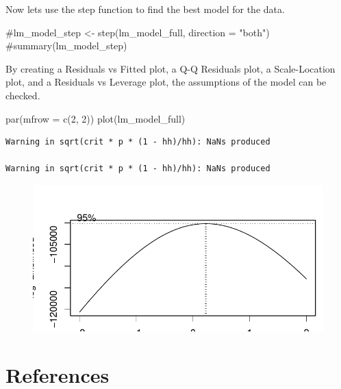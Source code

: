 \documentclass[
  super,
  preprint,
  3p]{elsarticle}
\newenvironment{Shaded}{\begin{snugshade}}{\end{snugshade}}
\newcommand{\AttributeTok}[1]{\textcolor[rgb]{0.40,0.45,0.13}{#1}}
\newcommand{\CommentTok}[1]{\textcolor[rgb]{0.37,0.37,0.37}{#1}}
\newcommand{\DecValTok}[1]{\textcolor[rgb]{0.68,0.00,0.00}{#1}}
\newcommand{\FunctionTok}[1]{\textcolor[rgb]{0.28,0.35,0.67}{#1}}
\newcommand{\NormalTok}[1]{\textcolor[rgb]{0.00,0.23,0.31}{#1}}
\begin{document}
Now lets use the step function to find the best model for the data.

\begin{Shaded}
\begin{Highlighting}[]
\CommentTok{\#lm\_model\_step \textless{}{-} step(lm\_model\_full, direction = "both")}
\CommentTok{\#summary(lm\_model\_step)}
\end{Highlighting}
\end{Shaded}

By creating a Residuals vs Fitted plot, a Q-Q Residuals plot, a
Scale-Location plot, and a Residuals vs Leverage plot, the assumptions
of the model can be checked.

\begin{Shaded}
\begin{Highlighting}[]
\FunctionTok{par}\NormalTok{(}\AttributeTok{mfrow =} \FunctionTok{c}\NormalTok{(}\DecValTok{2}\NormalTok{, }\DecValTok{2}\NormalTok{))}
\FunctionTok{plot}\NormalTok{(lm\_model\_full)}
\end{Highlighting}
\end{Shaded}

\begin{verbatim}
Warning in sqrt(crit * p * (1 - hh)/hh): NaNs produced

Warning in sqrt(crit * p * (1 - hh)/hh): NaNs produced
\end{verbatim}

\begin{figure}[H]

{\centering \includegraphics{project_report_files/figure-pdf/unnamed-chunk-7-1.pdf}

}

\end{figure}

\hypertarget{references}{%
\section*{References}\label{references}}
\end{document}
